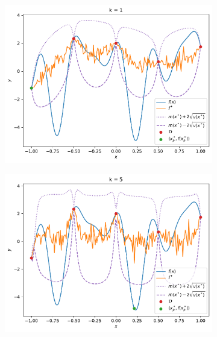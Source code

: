 \begin{figure}%
    \begin{subfigure}[t]{0.32\textwidth}
        \centering
        \includegraphics[width=\textwidth]{figures/gp/b2-k_1.pdf}
    \end{subfigure}
    \begin{subfigure}[t]{0.32\textwidth}
        \centering
        \includegraphics[width=\textwidth]{figures/gp/b2-k_5.pdf}
    \end{subfigure}
    \begin{subfigure}[t]{0.32\textwidth}
        \centering

\end{subfigure}
\end{figure}
